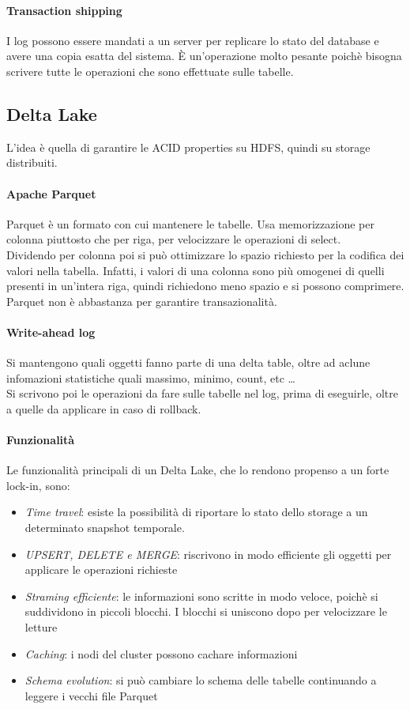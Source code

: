 \paragraph{Transaction shipping}
I log possono essere mandati a un server per replicare lo stato del database e avere
una copia esatta del sistema. È un'operazione molto pesante poichè bisogna scrivere
tutte le operazioni che sono effettuate sulle tabelle.

\subsection{Delta Lake}
L'idea è quella di garantire le ACID properties su HDFS, quindi su 
storage distribuiti.

\paragraph{Apache Parquet}
Parquet è un formato con cui mantenere le tabelle. Usa memorizzazione 
per colonna piuttosto che per riga, per velocizzare le operazioni di select.\\
Dividendo per colonna poi si può ottimizzare lo spazio richiesto per la codifica
dei valori nella tabella. Infatti, i valori di una colonna sono più omogenei
di quelli presenti in un'intera riga, quindi richiedono meno spazio e si possono
comprimere. Parquet non è abbastanza per garantire transazionalità.

\paragraph{Write-ahead log} 
Si mantengono quali oggetti fanno parte di una delta table, oltre ad 
aclune infomazioni statistiche quali massimo, minimo, count, etc \dots\\
Si scrivono poi le operazioni da fare sulle tabelle nel log, prima di eseguirle, 
oltre a quelle da applicare in caso di rollback.

\paragraph{Funzionalità}
Le funzionalità principali di un Delta Lake, che lo rendono propenso a un forte lock-in, sono:
\begin{itemize}
    \item \emph{Time travel}: esiste la possibilità di riportare lo stato dello storage a un determinato
    snapshot temporale.
    \item \emph{UPSERT, DELETE e MERGE}: riscrivono in modo efficiente gli oggetti per 
    applicare le operazioni richieste
    \item \emph{Straming efficiente}: le informazioni sono scritte in modo veloce, poichè 
    si suddividono in piccoli blocchi. I blocchi si uniscono dopo per velocizzare le letture
    \item \emph{Caching}: i nodi del cluster possono cachare informazioni
    \item \emph{Schema evolution}: si può cambiare lo schema delle tabelle continuando 
    a leggere i vecchi file Parquet 
\end{itemize}

